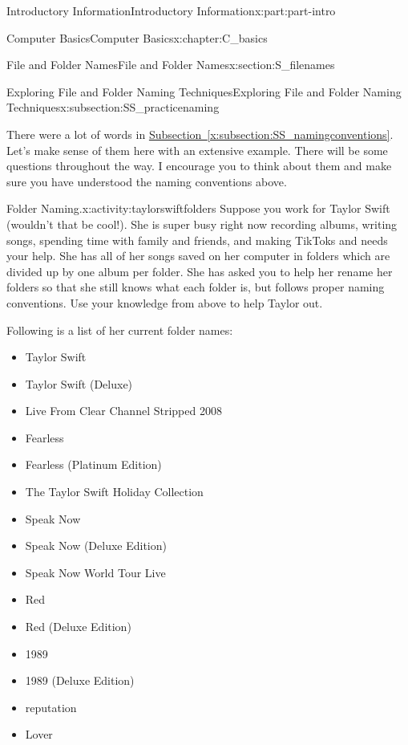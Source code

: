 \documentclass[oneside,10pt,]{book}
\newcommand{\xreffont}{\relax}
\begin{document}
\begin{partptx}{Introductory Information}{}{Introductory Information}{}{}{x:part:part-intro}
\begin{chapterptx}{Computer Basics}{}{Computer Basics}{}{}{x:chapter:C_basics}
\begin{sectionptx}{File and Folder Names}{}{File and Folder Names}{}{}{x:section:S_filenames}
\typeout{************************************************}
%
\begin{subsectionptx}{Exploring File and Folder Naming Techniques}{}{Exploring File and Folder Naming Techniques}{}{}{x:subsection:SS_practicenaming}
\begin{introduction}{}%
There were a lot of words in \hyperref[x:subsection:SS_namingconventions]{Subsection~{\xreffont\ref{x:subsection:SS_namingconventions}}}. Let's make sense of them here with an extensive example. There will be some questions throughout the way. I encourage you to think about them and make sure you have understood the naming conventions above.%
\end{introduction}%
\begin{activity}{Folder Naming.}{x:activity:taylorswiftfolders}%
%
Suppose you work for Taylor Swift (wouldn't that be cool!). She is super busy right now recording albums, writing songs, spending time with family and friends, and making TikToks and needs your help. She has all of her songs saved on her computer in folders which are divided up by one album per folder. She has asked you to help her rename her folders so that she still knows what each folder is, but follows proper naming conventions. Use your knowledge from above to help Taylor out.%
\par
Following is a list of her current folder names:%
\begin{multicols}{2}
\begin{itemize}[label=\textbullet]
\item{}Taylor Swift%
\item{}Taylor Swift (Deluxe)%
\item{}Live From Clear Channel Stripped 2008%
\item{}Fearless%
\item{}Fearless (Platinum Edition)%
\item{}The Taylor Swift Holiday Collection%
\item{}Speak Now%
\item{}Speak Now (Deluxe Edition)%
\item{}Speak Now World Tour Live%
\item{}Red%
\item{}Red (Deluxe Edition)%
\item{}1989%
\item{}1989 (Deluxe Edition)%
\item{}reputation%
\item{}Lover%

\end{itemize}
\end{multicols}
\end{activity}
\end{subsectionptx}
\end{sectionptx}
\end{chapterptx}
\end{partptx}
\end{document}
